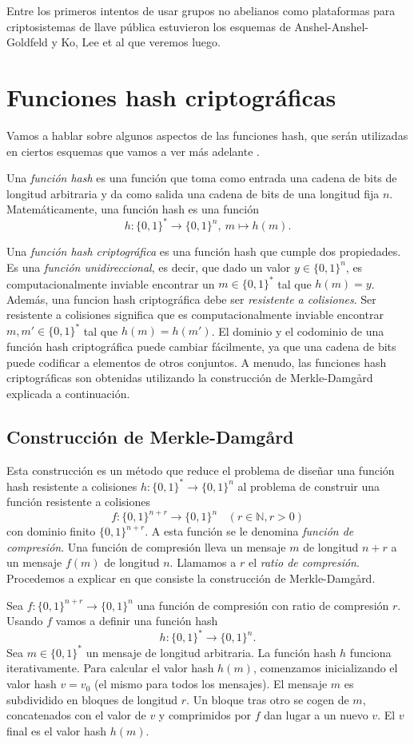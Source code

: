 \documentclass[12pt]{book}
\theoremstyle{definition}
\begin{document}
Entre los primeros intentos de usar grupos no abelianos como plataformas para criptosistemas de llave pública estuvieron los esquemas de Anshel-Anshel-Goldfeld y Ko, Lee et al que veremos luego.


\section{Funciones hash criptográficas}
Vamos a hablar sobre algunos aspectos de las funciones hash, que serán utilizadas en ciertos esquemas que vamos a ver más adelante \cite{in_cr}.

Una \textit{función hash} es una función que toma como entrada una cadena de bits de longitud arbitraria y da como salida una cadena de bits de una longitud fija $n$. Matemáticamente, una función hash es una función
$$h:\{0,1\}^*\rightarrow\{0,1\}^n,\ m\longmapsto h(m).$$

Una \textit{función hash criptográfica} es una función hash que cumple dos propiedades. Es una \textit{función unidireccional}, es decir, que dado un valor $y\in\{0,1\}^n$, es computacionalmente inviable encontrar un $m\in\{0,1\}^*$ tal que $h(m)=y$. Además, una funcion hash criptográfica debe ser \textit{resistente a colisiones}. Ser resistente a colisiones significa que es computacionalmente inviable encontrar $m,m'\in\{0,1\}^*$ tal que $h(m)=h(m')$.
El dominio y el codominio de una función hash criptográfica puede cambiar fácilmente, ya que una cadena de bits puede codificar a elementos de otros conjuntos. A menudo, las funciones hash criptográficas son obtenidas utilizando la construcción de Merkle-Damg\r{a}rd explicada a continuación.
\subsection{Construcción de Merkle-Damg\r{a}rd}
Esta construcción es un método que reduce el problema de diseñar una función hash resistente a colisiones $h:\{0,1\}^*\rightarrow\{0,1\}^n$ al problema de construir una función resistente a colisiones
$$f:\{0,1\}^{n+r}\rightarrow\{0,1\}^n\ \ \ \ (r\in\mathbb{N},r>0)$$
con dominio finito $\{0,1\}^{n+r}$. A esta función se le denomina \textit{función de compresión}. Una función de compresión lleva un mensaje $m$ de longitud $n+r$ a un mensaje $f(m)$ de longitud $n$. Llamamos a $r$ el \textit{ratio de compresión}. Procedemos a explicar en que consiste la construcción de Merkle-Damg\r{a}rd.

Sea $f:\{0,1\}^{n+r}\rightarrow\{0,1\}^n$ una función de compresión con ratio de compresión $r$. Usando $f$ vamos a definir una función hash
$$h:\{0,1\}^*\rightarrow\{0,1\}^n.$$
Sea $m\in\{0,1\}^*$ un mensaje de longitud arbitraria. La función hash $h$ funciona iterativamente. Para calcular el valor hash $h(m)$, comenzamos inicializando el valor hash $v=v_0$ (el mismo para todos los mensajes). El mensaje $m$ es subdividido en bloques de longitud $r$. Un bloque tras otro se cogen de $m$, concatenados con el valor de $v$ y comprimidos por $f$ dan lugar a un nuevo $v$. El $v$ final es el valor hash $h(m)$. 
\end{document}

